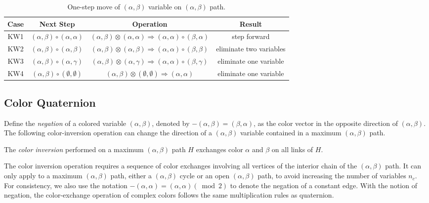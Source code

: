 \documentclass[11pt]{article}
\newenvironment{definition}[1][Definition]{\begin{trivlist}
\item[\hskip \labelsep {\bfseries #1}]}{\end{trivlist}}
\begin{document}
\begin{table}[htbp]
	\centering
	{\footnotesize
		\begin{tabular}{|c |c| c| c| }
			\hline 
			Case & Next Step & Operation & Result \\
			\hline \hline
			KW1 & $(\alpha,\beta)\circ (\alpha,\alpha)$ & $(\alpha,\beta)\otimes(\alpha,\alpha)\Rightarrow(\alpha,\alpha)\circ(\beta,\alpha)$&step forward\\ \hline 
			KW2 & $(\alpha,\beta)\circ (\alpha,\beta)$ & $(\alpha,\beta)\otimes(\alpha,\beta)\Rightarrow(\alpha,\alpha)\circ(\beta,\beta)$& eliminate two variables \\ \hline 
			KW3 & $(\alpha,\beta)\circ (\alpha,\gamma)$ & $(\alpha,\beta)\otimes(\alpha,\gamma)\Rightarrow(\alpha,\alpha)\circ(\beta,\gamma)$& eliminate one variable \\ \hline 
			KW4 & $(\alpha,\beta)\circ (\emptyset,\emptyset)$ & $(\alpha,\beta)\otimes(\emptyset,\emptyset)\Rightarrow(\alpha,\alpha)$& eliminate one variable \\
			\hline		
		\end{tabular}	
		}
	\caption{One-step move of $(\alpha,\beta)$ variable on $(\alpha,\beta)$ path.}
	\label{tab:KempeWalkcase}
\end{table}

\subsection{Color Quaternion}
Define the {\it negation} of a colored variable $(\alpha,\beta)$, denoted by $-(\alpha,\beta)=(\beta,\alpha)$, as the color vector in the opposite direction of $(\alpha,\beta)$. The following color-inversion operation can change the direction of a $(\alpha,\beta)$ variable contained in a maximum $(\alpha,\beta)$ path.

\begin{definition}
\label{definition:colorinversion}
The {\it color inversion} performed on a maximum $(\alpha,\beta)$ path $H$ exchanges color $\alpha$ and $\beta$ on all links of $H$.
\end{definition}

The color inversion operation requires a sequence of color exchanges involving all vertices of the interior chain of the $(\alpha,\beta)$ path. It can only apply to a maximum $(\alpha,\beta)$ path, either a $(\alpha,\beta)$ cycle or an open $(\alpha,\beta)$ path, to avoid increasing the number of variables $n_c$. For consistency, we also use the notation $-(\alpha,\alpha)=(\alpha,\alpha)(\bmod 2)$ to denote the negation of a constant edge. With the notion of negation, the color-exchange operation of complex colors follows the same multiplication rules as quaternion.
\end{document}
